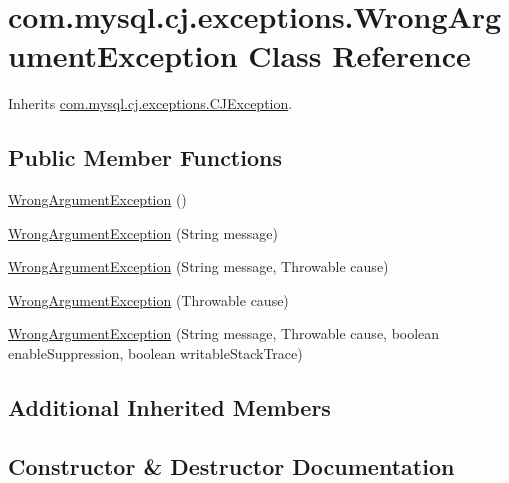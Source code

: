 \hypertarget{classcom_1_1mysql_1_1cj_1_1exceptions_1_1_wrong_argument_exception}{}\section{com.\+mysql.\+cj.\+exceptions.\+Wrong\+Argument\+Exception Class Reference}
\label{classcom_1_1mysql_1_1cj_1_1exceptions_1_1_wrong_argument_exception}


Inherits \mbox{\hyperlink{classcom_1_1mysql_1_1cj_1_1exceptions_1_1_c_j_exception}{com.\+mysql.\+cj.\+exceptions.\+C\+J\+Exception}}.

\subsection*{Public Member Functions}
\begin{DoxyCompactItemize}
\item 
\mbox{\hyperlink{classcom_1_1mysql_1_1cj_1_1exceptions_1_1_wrong_argument_exception_a73f25005abbf9d0284dd47bbb24e2985}{Wrong\+Argument\+Exception}} ()
\item 
\mbox{\hyperlink{classcom_1_1mysql_1_1cj_1_1exceptions_1_1_wrong_argument_exception_ae685c3d494cf24339b6b1cf3fa7bac5a}{Wrong\+Argument\+Exception}} (String message)
\item 
\mbox{\hyperlink{classcom_1_1mysql_1_1cj_1_1exceptions_1_1_wrong_argument_exception_adb557eb40291f63d89329267edee30af}{Wrong\+Argument\+Exception}} (String message, Throwable cause)
\item 
\mbox{\hyperlink{classcom_1_1mysql_1_1cj_1_1exceptions_1_1_wrong_argument_exception_a4bc38c75de10f7d0eca1685ceb9b8277}{Wrong\+Argument\+Exception}} (Throwable cause)
\item 
\mbox{\hyperlink{classcom_1_1mysql_1_1cj_1_1exceptions_1_1_wrong_argument_exception_a327a1523bc3ebd7b311798ec390a591a}{Wrong\+Argument\+Exception}} (String message, Throwable cause, boolean enable\+Suppression, boolean writable\+Stack\+Trace)
\end{DoxyCompactItemize}
\subsection*{Additional Inherited Members}


\subsection{Constructor \& Destructor Documentation}
\mbox{\label{classcom_1_1mysql_1_1cj_1_1exceptions_1_1_wrong_argument_exception_a73f25005abbf9d0284dd47bbb24e2985}} 
